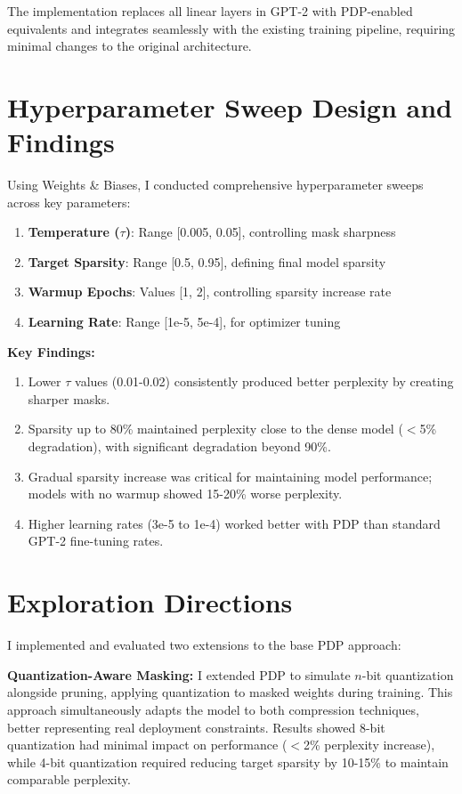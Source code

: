 \documentclass[11pt,letterpaper]{article}
\begin{document}
The implementation replaces all linear layers in GPT-2 with PDP-enabled equivalents and integrates seamlessly with the existing training pipeline, requiring minimal changes to the original architecture.

\section*{Hyperparameter Sweep Design and Findings}
Using Weights \& Biases, I conducted comprehensive hyperparameter sweeps across key parameters:

\begin{enumerate}[leftmargin=*,nosep]
    \item \textbf{Temperature ($\tau$)}: Range [0.005, 0.05], controlling mask sharpness
    \item \textbf{Target Sparsity}: Range [0.5, 0.95], defining final model sparsity
    \item \textbf{Warmup Epochs}: Values [1, 2], controlling sparsity increase rate
    \item \textbf{Learning Rate}: Range [1e-5, 5e-4], for optimizer tuning
\end{enumerate}

\textbf{Key Findings:}
\begin{enumerate}[leftmargin=*,nosep]
    \item Lower $\tau$ values (0.01-0.02) consistently produced better perplexity by creating sharper masks.
    \item Sparsity up to 80\% maintained perplexity close to the dense model ($<$5\% degradation), with significant degradation beyond 90\%.
    \item Gradual sparsity increase was critical for maintaining model performance; models with no warmup showed 15-20\% worse perplexity.
    \item Higher learning rates (3e-5 to 1e-4) worked better with PDP than standard GPT-2 fine-tuning rates.
\end{enumerate}

\section*{Exploration Directions}
I implemented and evaluated two extensions to the base PDP approach:

\textbf{Quantization-Aware Masking:} I extended PDP to simulate $n$-bit quantization alongside pruning, applying quantization to masked weights during training. This approach simultaneously adapts the model to both compression techniques, better representing real deployment constraints. Results showed 8-bit quantization had minimal impact on performance ($<$2\% perplexity increase), while 4-bit quantization required reducing target sparsity by 10-15\% to maintain comparable perplexity.
\end{document}
